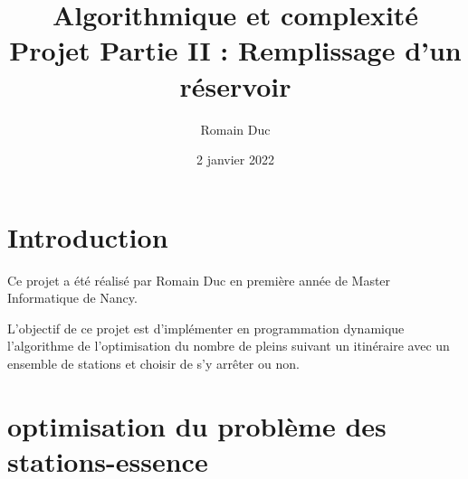 \documentclass[a4paper,11pt]{article}
\title{Algorithmique et complexité Projet Partie II : Remplissage d'un réservoir}
\author{Romain Duc}
\date{2 janvier 2022}
\begin{document}
    \maketitle
    \newpage

    \section{Introduction}\label{sec:introduction}
        Ce projet a été réalisé par Romain Duc en première année de Master Informatique de Nancy.

        L'objectif de ce projet est d'implémenter en programmation dynamique l'algorithme de l'optimisation du nombre de pleins suivant un itinéraire avec un ensemble de stations et choisir de s'y arrêter ou non.
        
    
    \section{optimisation du problème des stations-essence }
\end{document}
